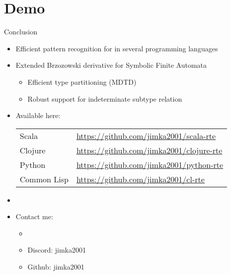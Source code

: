 \section{Demo}


{
\begin{frame}{Conclusion}
  \begin{itemize}
  \item Efficient pattern recognition for  in several programming languages
  \item Extended Brzozowski derivative for Symbolic Finite Automata
    \begin{itemize}
    \item Efficient type partitioning (MDTD)
    \item Robust support for indeterminate subtype relation
    \end{itemize}
  \item Available here:
    \begin{tabular}{ll}
    Scala & \url{https://github.com/jimka2001/scala-rte}\\
    Clojure & \url{https://github.com/jimka2001/clojure-rte}\\
    Python & \url{https://github.com/jimka2001/python-rte}\\
    Common Lisp & \url{https://github.com/jimka2001/cl-rte}    
  \end{tabular}
  \item {}

    \bigskip

  \item Contact me: 
    \begin{itemize}
    \item {}
    \item Discord: jimka2001
    \item Github: jimka2001
      
    \end{itemize}
  \end{itemize}
\end{frame}

}
